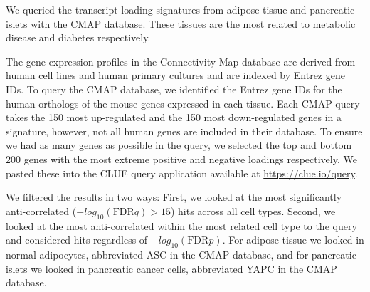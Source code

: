 \documentclass[
]{article}
\begin{document}
We queried the transcript loading signatures from adipose tissue and
pancreatic islets with the CMAP database. These tissues are the most
related to metabolic disease and diabetes respectively.

The gene expression profiles in the Connectivity Map database are
derived from human cell lines and human primary cultures and are indexed
by Entrez gene IDs. To query the CMAP database, we identified the Entrez
gene IDs for the human orthologs of the mouse genes expressed in each
tissue. Each CMAP query takes the 150 most up-regulated and the 150 most
down-regulated genes in a signature, however, not all human genes are
included in their database. To ensure we had as many genes as possible
in the query, we selected the top and bottom 200 genes with the most
extreme positive and negative loadings respectively. We pasted these
into the CLUE query application available at
\url{https://clue.io/query}.

We filtered the results in two ways: First, we looked at the most
significantly anti-correlated (\(-log_{10}(\mathrm{FDR} q) > 15\)) hits
across all cell types. Second, we looked at the most anti-correlated
within the most related cell type to the query and considered hits
regardless of \(-log_{10}(\mathrm{FDR} p)\). For adipose tissue we
looked in normal adipocytes, abbreviated ASC in the CMAP database, and
for pancreatic islets we looked in pancreatic cancer cells, abbreviated
YAPC in the CMAP database.



\end{document}
